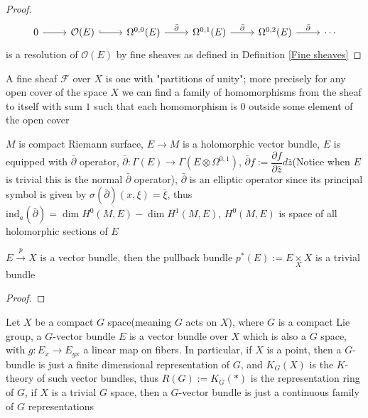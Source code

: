 \documentclass[../main.tex]{subfiles}
\begin{document}
\begin{proof}
\[
\begin{tikzcd}
{0} \arrow[r] &{\mathcal{O}(E)}\arrow[r, hook] &{\Omega^{0,0}(E)} \arrow[r, "\bar\partial"] & {\Omega^{0,1}(E)} \arrow[r, "\bar\partial"] & {\Omega^{0,2}(E)} \arrow[r, "\bar\partial"] & {\cdots}
\end{tikzcd}
\]
is a resolution of ${\mathcal{O}(E)}$ by fine sheaves as defined in Definition \ref{Fine sheaves}
\end{proof}

\begin{definition}\label{Fine sheaves}
A fine sheaf $\mathcal{F}$ over $X$ is one with "partitions of unity"; more precisely for any open cover of the space $X$ we can find a family of homomorphisms from the sheaf to itself with sum $1$ such that each homomorphism is $0$ outside some element of the open cover
\end{definition}

\begin{example}
$M$ is compact Riemann surface, $E\to M$ is a holomorphic vector bundle, $E$ is equipped with $\bar\partial$ operator, $\bar\partial: \Gamma(E)\to \Gamma\left(E\otimes\Omega^{0,1}\right)$, $\bar\partial f:=\dfrac{\partial f}{\partial\bar z}d\bar z$(Notice when $E$ is trivial this is the normal $\bar\partial$ operator), $\bar\partial$ is an elliptic operator since its principal symbol is given by $\sigma(\bar\partial)(x,\xi)=\bar\xi$, thus $\mathrm{ind}_a(\bar\partial)=\dim H^0(M,E)-\dim H^1(M,E)$, $H^0(M,E)$ is space of all holomorphic sections of $E$
\end{example}

\begin{lemma}
$E\overset{p}{\to} X$ is a vector bundle, then the pullback bundle $p^*(E):=E\underset{X}{\times}X$ is a trivial bundle
\end{lemma}

\begin{proof}

\end{proof}

\begin{definition}
Let $X$ be a compact $G$ space(meaning $G$ acts on $X$), where $G$ is a compact Lie group, a $G$-vector bundle $E$ is a vector bundle over $X$ which is also a $G$ space, with $g: E_x\to E_{gx}$ a linear map on fibers. In particular, if $X$ is a point, then a $G$-bundle is just a finite dimensional representation of $G$, and $K_G(X)$ is the $K$-theory of such vector bundles, thus $R(G):=K_G(*)$ is the representation ring of $G$, if $X$ is a trivial $G$ space, then a $G$-vector bundle is just a continuous family of $G$ representations
\end{definition}
\end{document}
